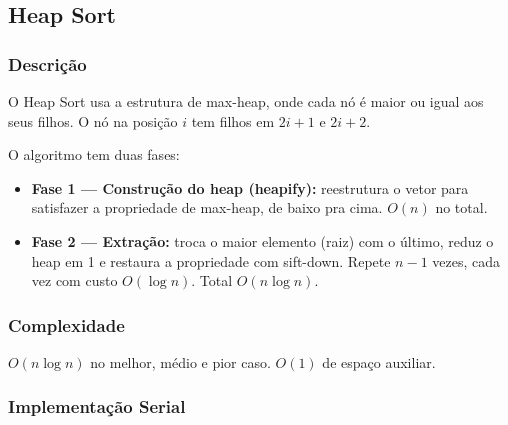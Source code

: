 \documentclass[12pt]{article}
\begin{document}
\subsection{Heap Sort}

\subsubsection{Descrição}

O Heap Sort usa a estrutura de max-heap, onde cada nó é maior ou igual aos seus filhos. O nó na posição $i$ tem filhos em $2i+1$ e $2i+2$.

O algoritmo tem duas fases:
\begin{itemize}
    \item \textbf{Fase 1 --- Construção do heap (heapify):} reestrutura o vetor para satisfazer a propriedade de max-heap, de baixo pra cima. $O(n)$ no total.
    \item \textbf{Fase 2 --- Extração:} troca o maior elemento (raiz) com o último, reduz o heap em 1 e restaura a propriedade com sift-down. Repete $n-1$ vezes, cada vez com custo $O(\log n)$. Total $O(n \log n)$.
\end{itemize}

\subsubsection{Complexidade}

$O(n \log n)$ no melhor, médio e pior caso. $O(1)$ de espaço auxiliar.

\subsubsection{Implementação Serial}
\end{document}
